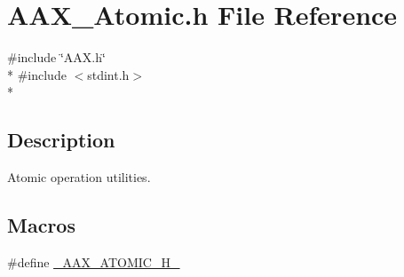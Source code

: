 \hypertarget{a00159}{}\section{A\+A\+X\+\_\+\+Atomic.\+h File Reference}
\label{a00159}
{\ttfamily \#include \char`\"{}A\+A\+X.\+h\char`\"{}}\\*
{\ttfamily \#include $<$stdint.\+h$>$}\\*


\subsection{Description}
Atomic operation utilities. 

\subsection*{Macros}
\begin{DoxyCompactItemize}
\item 
\#define \hyperlink{a00159_a95d8ffad4ab4b65ff2d28aa76e167daf}{\+\_\+\+A\+A\+X\+\_\+\+A\+T\+O\+M\+I\+C\+\_\+\+H\+\_\+}
\end{DoxyCompactItemize}
